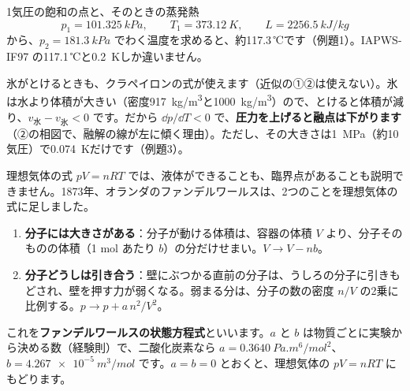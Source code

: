 \begin{phflow}[わく温度と圧力]
\end{phflow}

1気圧の飽和の点と、そのときの蒸発熱
\[p_1=\qty{101.325}{kPa},\qquad T_1=\qty{373.12}{K},\qquad L=\qty{2256.5}{kJ/kg}\]
から、$p_2=\qty{181.3}{kPa}$ でわく温度を求めると、約117.3\,℃です（例題1）。IAPWS-IF97 の117.1\,℃と\qty{0.2}{K}しか違いません。

氷がとけるときも、クラペイロンの式が使えます（近似の①②は使えない）。氷は水より体積が大きい（密度\qty{917}{kg/m^3}と\qty{1000}{kg/m^3}）ので、とけると体積が減り、$v_{\text{水}}-v_{\text{氷}}<0$ です。だから $\dd p/\dd T<0$ で、\textbf{圧力を上げると融点は下がります}（②の相図で、融解の線が左に傾く理由）。ただし、その大きさは\qty{1}{MPa}（約10気圧）で\qty{0.074}{K}だけです（例題3）。

\label{ph:熱-10:sec8}
理想気体の式 $pV=nRT$ では、液体ができることも、臨界点があることも説明できません。1873年、オランダのファンデルワールスは、2つのことを理想気体の式に足しました。
\begin{enumerate}[label={\bkcircled{\arabic*}}, leftmargin=2.4\zw, itemsep=1pt, topsep=2pt]
\item \textbf{分子には大きさがある}：分子が動ける体積は、容器の体積 $V$ より、分子そのものの体積（1 mol あたり $b$）の分だけせまい。$V\to V-nb$。
\item \textbf{分子どうしは引き合う}：壁にぶつかる直前の分子は、うしろの分子に引きもどされ、壁を押す力が弱くなる。弱まる分は、分子の数の密度 $n/V$ の2乗に比例する。$p\to p+a\,n^2/V^2$。
\end{enumerate}
これを\textbf{ファンデルワールスの状態方程式}といいます。$a$ と $b$ は物質ごとに実験から決める数（経験則）で、二酸化炭素なら $a=\qty{0.3640}{Pa.m^6/mol^2}$、$b=\qty{4.267e-5}{m^3/mol}$ です。$a=b=0$ とおくと、理想気体の $pV=nRT$ にもどります。

